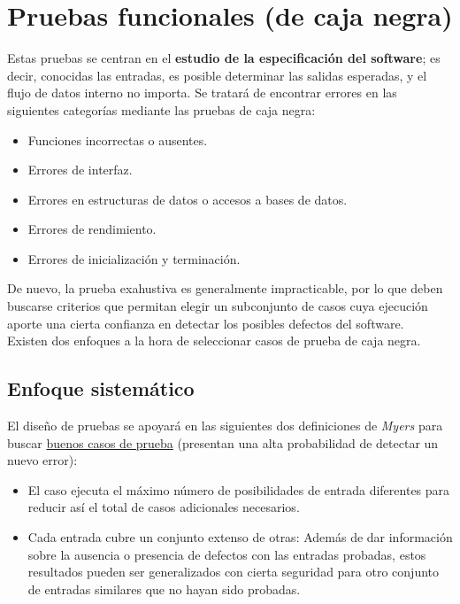 \section{Pruebas funcionales (de caja negra)}

Estas pruebas se centran en el \textbf{estudio de la especificación del software}; es decir, conocidas las entradas, es posible determinar las salidas esperadas, y el flujo de datos interno no importa. Se tratará de encontrar errores en las siguientes categorías mediante las pruebas de caja negra:

\begin{itemize}
    \item Funciones incorrectas o ausentes.
    \item Errores de interfaz.
    \item Errores en estructuras de datos o accesos a bases de datos.
    \item Errores de rendimiento.
    \item Errores de inicialización y terminación.
\end{itemize}

De nuevo, la prueba exahustiva es generalmente impracticable, por lo que deben buscarse criterios que permitan elegir un subconjunto de casos cuya ejecución aporte una cierta confianza en detectar los posibles defectos del software.\\

Existen dos enfoques a la hora de seleccionar casos de prueba de caja negra.

\subsection{Enfoque sistemático}

El diseño de pruebas se apoyará en las siguientes dos definiciones de \textit{Myers} para buscar \uline{buenos casos de prueba} (presentan una alta probabilidad de detectar un nuevo error):

\begin{itemize}
    \item El caso ejecuta el máximo número de posibilidades de entrada diferentes para reducir así el total de casos adicionales necesarios.
    \item Cada entrada cubre un conjunto extenso de otras: Además de dar información sobre la ausencia o presencia de defectos con las entradas probadas, estos resultados pueden ser generalizados con cierta seguridad para otro conjunto de entradas similares que no hayan sido probadas.
\end{itemize}

